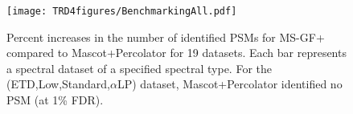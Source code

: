 \begin{figure}[tbp]
\begin{center}
\texttt{[image: TRD4figures/BenchmarkingAll.pdf]}
\caption{\footnotesize 
Percent increases in the number of identified PSMs for MS-GF+ compared to Mascot+Percolator for  19 datasets.
Each bar represents a spectral dataset of a specified spectral type.
For the (ETD,Low,Standard,$\alpha$LP) dataset, Mascot+Percolator identified no PSM (at 1\% FDR). 
}
\label{Comp_All}
\end{center}
\end{figure}








